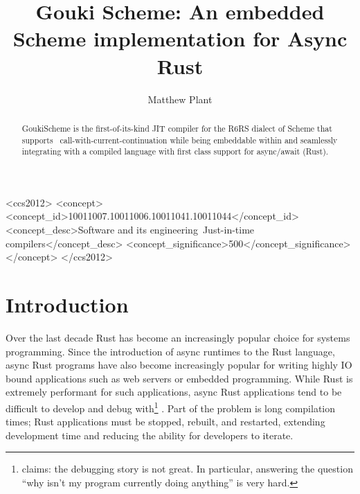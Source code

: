 \documentclass[sigplan,review,anonymous]{acmart}
\begin{document}

\begin{CCSXML}
<ccs2012>
   <concept>
       <concept_id>10011007.10011006.10011041.10011044</concept_id>
       <concept_desc>Software and its engineering~Just-in-time compilers</concept_desc>
       <concept_significance>500</concept_significance>
       </concept>
 </ccs2012>
\end{CCSXML}


\title{Gouki Scheme: An embedded Scheme implementation for Async Rust}

\author{Matthew Plant}

\begin{abstract}

  GoukiScheme is the first-of-its-kind JIT compiler for the R6RS dialect of
  Scheme that supports \
  call-with-current-continuation while being embeddable
  within and seamlessly integrating with a compiled language with first class
  support for async/await (Rust).

\end{abstract}

\maketitle

\section{Introduction}

Over the last decade Rust has become an increasingly popular choice for systems
programming. Since the introduction of async runtimes to the Rust language,
async Rust programs have also become increasingly popular for writing highly
IO bound applications such as web servers or embedded programming. While Rust
is extremely performant for such applications\cite{embedded}, async Rust
applications tend to be difficult to develop and debug with\footnote{\citet{debugger} claims: the debugging story is not great. In particular, answering the question “why isn’t my program currently doing anything” is very hard.}
. Part of the problem
is long compilation times\cite{slow}; Rust applications must be stopped, rebuilt, and
restarted, extending development time and reducing the ability for developers to
iterate.
\end{document}
